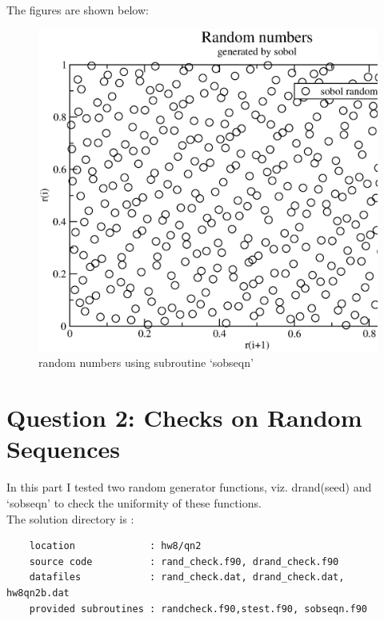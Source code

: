 \documentclass[11pt,a4paper,english]{article}
\begin{document}
    	    The figures are shown below:\\
	\begin{figure}[h!]
	\centering
	\includegraphics [scale=0.6]{figures/hw8qn1e.eps}
	\caption{random numbers using subroutine `sobseqn' }
	\end{figure}
	\clearpage
    
     

\clearpage	
\section{Question 2: Checks on Random Sequences }

	In this part I tested two random generator functions,
	viz. drand(seed) and `sobseqn' to check the uniformity of these functions.\\
	
		
		The solution directory is :\\
	\begin{verbatim}
	location             : hw8/qn2
	source code          : rand_check.f90, drand_check.f90
	datafiles            : rand_check.dat, drand_check.dat, hw8qn2b.dat
	provided subroutines : randcheck.f90,stest.f90, sobseqn.f90 
	\end{verbatim}
\end{document}
